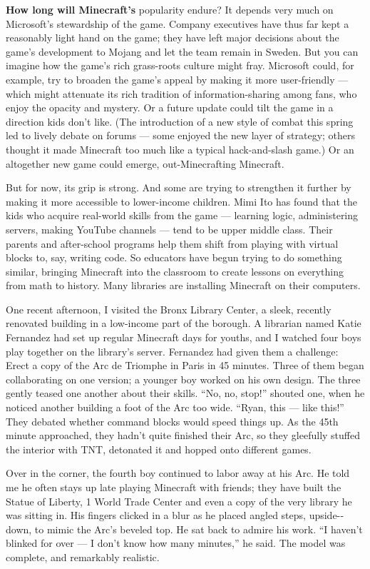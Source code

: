 \textbf{How long will Minecraft's} popularity endure? It depends very
much on Microsoft's stewardship of the game. Company executives have
thus far kept a reasonably light hand on the game; they have left major
decisions about the game's development to Mojang and let the team remain
in Sweden. But you can imagine how the game's rich grass-roots culture
might fray. Microsoft could, for example, try to broaden the game's
appeal by making it more user-­friendly --- which might attenuate its
rich tradition of information-­sharing among fans, who enjoy the opacity
and mystery. Or a future update could tilt the game in a direction kids
don't like. (The introduction of a new style of combat this spring led
to lively debate on forums --- some enjoyed the new layer of strategy;
others thought it made Minecraft too much like a typical hack-and-slash
game.) Or an altogether new game could emerge, out-­Minecrafting
Minecraft.

But for now, its grip is strong. And some are trying to strengthen it
further by making it more accessible to lower-­income children. Mimi Ito
has found that the kids who acquire real-world skills from the game ---
learning logic, administering servers, making YouTube channels --- tend
to be upper middle class. Their parents and after-­school programs help
them shift from playing with virtual blocks to, say, writing code. So
educators have begun trying to do something similar, bringing Minecraft
into the classroom to create lessons on everything from math to history.
Many libraries are installing Minecraft on their computers.

One recent afternoon, I visited the Bronx Library Center, a sleek,
recently renovated building in a low-­income part of the borough. A
librarian named Katie Fernandez had set up regular Minecraft days for
youths, and I watched four boys play together on the library's server.
Fernandez had given them a challenge: Erect a copy of the Arc de
Triomphe in Paris in 45 minutes. Three of them began collaborating on
one version; a younger boy worked on his own design. The three gently
teased one another about their skills. ``No, no, stop!'' shouted one,
when he noticed another building a foot of the Arc too wide. ``Ryan,
this --- like this!'' They debated whether command blocks would speed
things up. As the 45th minute approached, they hadn't quite finished
their Arc, so they gleefully stuffed the interior with TNT, detonated it
and hopped onto different games.

Over in the corner, the fourth boy continued to labor away at his Arc.
He told me he often stays up late playing Minecraft with friends; they
have built the Statue of Liberty, 1 World Trade Center and even a copy
of the very library he was sitting in. His fingers clicked in a blur as
he placed angled steps, upside-­down, to mimic the Arc's beveled top. He
sat back to admire his work. ``I haven't blinked for over --- I don't
know how many minutes,'' he said. The model was complete, and remarkably
realistic.


